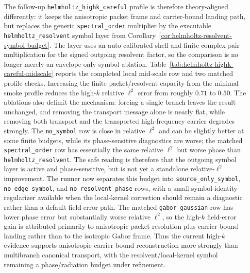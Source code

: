 The follow-up \texttt{helmholtz\_highk\_careful} profile is therefore theory-aligned differently: it keeps the anisotropic packet frame and carrier-bound landing path, but replaces the generic \texttt{spectral\_order} multiplier by the executable \texttt{helmholtz\_resolvent} symbol layer from Corollary~\ref{cor:helmholtz-resolvent-symbol-budget}.  The layer uses an auto-calibrated shell and finite complex-pair multiplication for the signed outgoing resolvent factor, so the comparison is no longer merely an envelope-only symbol ablation.  Table~\ref{tab:helmholtz-highk-careful-midscale} reports the completed local mid-scale row and two matched profile checks.  Increasing the finite packet/resolvent capacity from the minimal smoke profile reduces the high-$k$ relative $\ell^2$ error from roughly $0.71$ to $0.50$.  The ablations also delimit the mechanism: forcing a single branch leaves the result unchanged, and removing the transport message alone is nearly flat, while removing both transport and the transported high-frequency carrier degrades strongly.  The \texttt{no\_symbol} row is close in relative $\ell^2$ and can be slightly better at some finite budgets, while its phase-sensitive diagnostics are worse; the matched \texttt{spectral\_order} row has essentially the same relative $\ell^2$ but worse phase than \texttt{helmholtz\_resolvent}.  The safe reading is therefore that the outgoing symbol layer is active and phase-sensitive, but is not yet a standalone relative-$\ell^2$ improvement.  The runner now separates this budget into \texttt{source\_only\_symbol}, \texttt{no\_edge\_symbol}, and \texttt{no\_resolvent\_phase} rows, with a small symbol-identity regularizer available when the local-kernel correction should remain a diagnostic rather than a default field-error path.  The matched \texttt{gabor\_gaussian} row has lower phase error but substantially worse relative $\ell^2$, so the high-$k$ field-error gain is attributed primarily to anisotropic packet resolution plus carrier-bound landing rather than to the isotropic Gabor frame.  Thus the current high-$k$ evidence supports anisotropic carrier-bound reconstruction more strongly than multibranch canonical transport, with the resolvent/local-kernel symbol remaining a phase/radiation budget under refinement.



